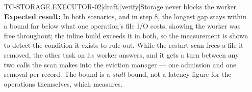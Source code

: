 \begin{requirement}{TC-STORAGE.EXECUTOR-02}[draft][verify]{Storage never blocks the worker}
  \textbf{Expected result:} In both scenarios, and in step 8, the longest gap
  stays within a bound far below what one operation's file I/O costs, showing the worker was
  free throughout; the inline build exceeds it in both, so the measurement is
  shown to detect the condition it exists to rule out. While the restart
  scan frees a file it removed, the other task on its worker answers, and it
  gets a turn between any two calls the scan makes into the eviction manager
  --- one admission and one removal per record. The bound is a
  \emph{stall} bound, not a latency figure for the operations themselves,
  which  measures.



\end{requirement}

